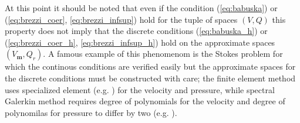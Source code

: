 \documentclass[a4paper,10pt]{article}
\newcommand{\mm}{\ensuremath{\mathbf{m}}}
\begin{document}
  At this point it should be noted that even if the condition (\ref{eq:babuska})
  or (\ref{eq:brezzi_coer}, \ref{eq:brezzi_infsup}) hold for the tuple of spaces
  $(V, Q)$ this property does not imply that the discrete conditions
  (\ref{eq:babuska_h}) or (\ref{eq:brezzi_coer_h}, \ref{eq:brezzi_infsup_h})
  hold on the approximate spaces $(V_{\mm}, Q_{r})$. A famous example of
  this phenomenom is the Stokes problem for which the continous conditions are
  verified easily but the approximate spaces for the discrete conditions must
  be constructed with care; the finite element method uses specialized element
  (e.g. \cite{th_mini}) for the velocity and pressure, while spectral Galerkin
  method requires degree of polynomials for the velocity and degree of
  polynomilas for pressure to differ by two (e.g. \cite{canuto}).
\end{document}
